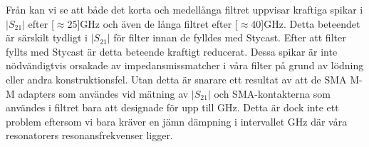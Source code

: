 \documentclass[main.tex]{subfiles}
\begin{document}
Från  kan vi se att både det korta och medellånga filtret uppvisar kraftiga spikar i $|S_{21}|$ efter \unit[$\approx 25$]{GHz} och även de långa filtret efter \unit[$\approx 40$]{GHz}. Detta beteendet är särskilt tydligt i $|S_{21}|$ för filter innan de fylldes med Stycast. Efter att filter fyllts med Stycast är detta beteende kraftigt reducerat. Dessa spikar är inte nödvändigtvis orsakade av impedansmissmatcher i våra filter på grund av lödning eller andra konstruktionsfel. Utan detta är snarare ett resultat av att de SMA M-M adapters som användes vid mätning av $|S_{21}|$ och SMA-kontakterna som användes i filtret bara att designade för upp till \unit[18]{GHz}. Detta är dock inte ett problem eftersom vi bara kräver en jämn dämpning i intervallet \unit[4-8]{GHz} där våra resonatorers resonansfrekvenser ligger.
\end{document}
